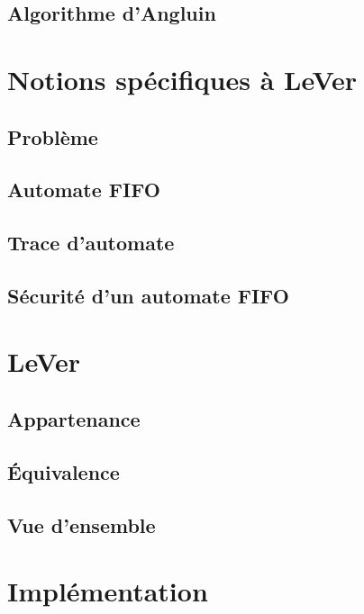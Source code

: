	\section{Algorithme d'Angluin}\label{sec:angluin}

	\chapter{Notions spécifiques à LeVer}\label{ch:specific}
	\section{Problème}\label{sec:prob}%
	\section{Automate FIFO}\label{sec:fifo}
	\section{Trace d'automate}\label{sec:trace}%
	\section{Sécurité d'un automate FIFO}\label{sec:unsafe}%

	\chapter{LeVer}\label{ch:lever}
	\section{Appartenance}\label{sec:membership}
	\section{Équivalence}\label{sec:equivalence}
	\section{Vue d'ensemble}\label{sec:global}


	\chapter{Implémentation}\label{ch:impl}
